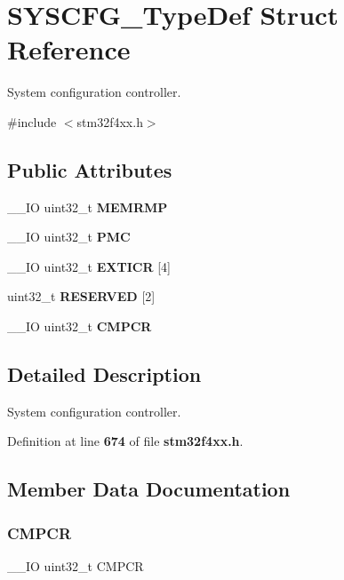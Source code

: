 \section{S\+Y\+S\+C\+F\+G\+\_\+\+Type\+Def Struct Reference}
\label{structSYSCFG__TypeDef}


System configuration controller.  




{\ttfamily \#include $<$stm32f4xx.\+h$>$}

\subsection*{Public Attributes}
\begin{DoxyCompactItemize}
\item 
\+\_\+\+\_\+\+IO uint32\+\_\+t \textbf{ M\+E\+M\+R\+MP}
\item 
\+\_\+\+\_\+\+IO uint32\+\_\+t \textbf{ P\+MC}
\item 
\+\_\+\+\_\+\+IO uint32\+\_\+t \textbf{ E\+X\+T\+I\+CR} [4]
\item 
uint32\+\_\+t \textbf{ R\+E\+S\+E\+R\+V\+ED} [2]
\item 
\+\_\+\+\_\+\+IO uint32\+\_\+t \textbf{ C\+M\+P\+CR}
\end{DoxyCompactItemize}


\subsection{Detailed Description}
System configuration controller. 

Definition at line \textbf{ 674} of file \textbf{ stm32f4xx.\+h}.



\subsection{Member Data Documentation}
\mbox{\label{structSYSCFG__TypeDef_a08ddbac546fa9928256654d31255c8c3}} 
\subsubsection{C\+M\+P\+CR}
{\footnotesize\ttfamily \+\_\+\+\_\+\+IO uint32\+\_\+t C\+M\+P\+CR}

